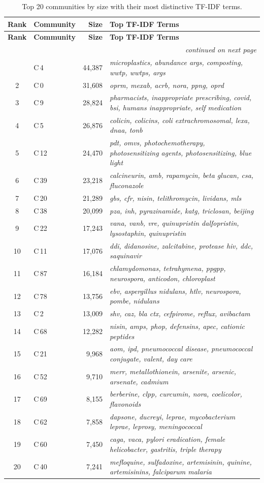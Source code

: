 \begin{longtable}{clrp{9cm}}
\toprule
\textbf{Rank} & \textbf{Community} & \textbf{Size} & \textbf{Top TF-IDF Terms} \\
\midrule
\endfirsthead
\toprule
\textbf{Rank} & \textbf{Community} & \textbf{Size} & \textbf{Top TF-IDF Terms} \\
\midrule
\endhead
\midrule \multicolumn{4}{r}{\small\itshape continued on next page} \\
\endfoot
\bottomrule
\caption{Top 20 communities by size with their most distinctive TF-IDF terms.}
\label{tab:all_topics}
\endlastfoot
1 & C\,4 & 44,387 & \textit{microplastics, abundance args, composting, wwtp, wwtps, args} \\
2 & C\,0 & 31,608 & \textit{oprm, mexab, acrb, nora, ppng, oprd} \\
3 & C\,9 & 28,824 & \textit{pharmacists, inappropriate prescribing, covid, bsi, humans inappropriate, self medication} \\
4 & C\,5 & 26,876 & \textit{colicin, colicins, coli extrachromosomal, lexa, dnaa, tonb} \\
5 & C\,12 & 24,470 & \textit{pdt, omvs, photochemotherapy, photosensitizing agents, photosensitizing, blue light} \\
6 & C\,39 & 23,218 & \textit{calcineurin, amb, rapamycin, beta glucan, csa, fluconazole} \\
7 & C\,20 & 21,289 & \textit{gbs, cfr, nisin, telithromycin, lividans, mls} \\
8 & C\,38 & 20,099 & \textit{pza, inh, pyrazinamide, katg, triclosan, beijing} \\
9 & C\,22 & 17,243 & \textit{vana, vanb, vre, quinupristin dalfopristin, lysostaphin, quinupristin} \\
10 & C\,11 & 17,076 & \textit{ddi, didanosine, zalcitabine, protease hiv, ddc, saquinavir} \\
11 & C\,87 & 16,184 & \textit{chlamydomonas, tetrahymena, ppgpp, neurospora, anticodon, chloroplast} \\
12 & C\,78 & 13,756 & \textit{ebv, aspergillus nidulans, htlv, neurospora, pombe, nidulans} \\
13 & C\,2 & 13,009 & \textit{shv, caz, bla ctx, cefpirome, reflux, avibactam} \\
14 & C\,68 & 12,282 & \textit{nisin, amps, phop, defensins, apec, cationic peptides} \\
15 & C\,21 & 9,968 & \textit{aom, ipd, pneumococcal disease, pneumococcal conjugate, valent, day care} \\
16 & C\,52 & 9,710 & \textit{merr, metallothionein, arsenite, arsenic, arsenate, cadmium} \\
17 & C\,69 & 8,155 & \textit{berberine, clpp, curcumin, nora, coelicolor, flavonoids} \\
18 & C\,62 & 7,858 & \textit{dapsone, ducreyi, leprae, mycobacterium leprae, leprosy, meningococcal} \\
19 & C\,60 & 7,450 & \textit{caga, vaca, pylori eradication, female helicobacter, gastritis, triple therapy} \\
20 & C\,40 & 7,241 & \textit{mefloquine, sulfadoxine, artemisinin, quinine, artemisinins, falciparum malaria} \\
\end{longtable}
